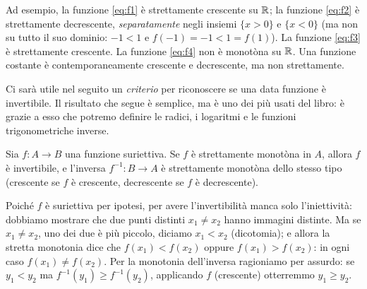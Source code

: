 \begin{marginfigure}
\centering
{}
\caption{In blu una funzione strettamente crescente; in rame una funzione crescente
ma non strettamente: ha dei «pianerottoli» su cui $f(x_1)=f(x_2)$ con $x_1<x_2$.}
\end{marginfigure}

Ad esempio, la funzione \eqref{eq:f1} è strettamente crescente su $\mathbb{R}$; la funzione
\eqref{eq:f2} è strettamente decrescente, \emph{separatamente} negli insiemi $\{x>0\}$ e
$\{x<0\}$ (ma non su tutto il suo dominio: $-1<1$ e $f(-1)=-1<1=f(1)$). La funzione
\eqref{eq:f3} è strettamente crescente. La funzione \eqref{eq:f4} non è monotòna su
$\mathbb{R}$. Una funzione costante è contemporaneamente crescente e decrescente, ma non
strettamente.

Ci sarà utile nel seguito un \emph{criterio} per riconoscere se una data funzione è
invertibile. Il risultato che segue è semplice, ma è uno dei più usati del libro: è
grazie a esso che potremo definire le radici, i logaritmi e le funzioni trigonometriche
inverse.

\begin{teorema}\label{teo:monotona-invertibile}
Sia $f\colon A\to B$ una funzione suriettiva. Se $f$ è strettamente monotòna in $A$,
allora $f$ è invertibile, e l'inversa $f^{-1}\colon B\to A$ è strettamente monotòna
dello stesso tipo (crescente se $f$ è crescente, decrescente se $f$ è decrescente).
\end{teorema}

\begin{schema}
\end{schema}

\begin{strategia}
Poiché $f$ è suriettiva per ipotesi, per avere l'invertibilità manca solo
l'iniettività: dobbiamo mostrare che due punti distinti $x_{1}\neq x_{2}$ hanno immagini
distinte. Ma se $x_{1}\neq x_{2}$, uno dei due è più piccolo, diciamo $x_{1}<x_{2}$
(dicotomia); e allora la stretta monotonia dice che $f(x_{1})<f(x_{2})$ oppure
$f(x_{1})>f(x_{2})$: in ogni caso $f(x_{1})\neq f(x_{2})$. Per la monotonia
dell'inversa ragioniamo per assurdo: se $y_{1}<y_{2}$ ma $f^{-1}(y_{1})\ge f^{-1}(y_{2})$,
applicando $f$ (crescente) otterremmo $y_{1}\ge y_{2}$.
\end{strategia}


